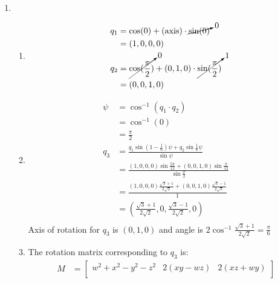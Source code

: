 \documentclass[11pt, oneside]{article}
\begin{document}
\begin{enumerate}[Problem 1:]
\begin{enumerate}[1.]
\begin{enumerate}[a)]
            {
              \begin{center}
                \myTikz
                {
                }
              \end{center}
            }
        \end{enumerate}
    \end{enumerate}
  \item
    \begin{enumerate}[1.]
      \item 
        \begin{align*}
          q_1 &= \cos(0) + (\mathrm{axis})\cdot\cancelto{0}{\sin(0)}\\
              &= (1,0,0,0)\\
          q_2 &= \cancelto{0}{\cos(\frac \pi 2)} + (0,1,0)\cdot\cancelto{1}{\sin(\frac \pi 2)}\\ 
              &= (0,0,1,0)
        \end{align*}
      \item
        \begin{align*}
          \psi &= \cos^{-1}(q_1\cdot q_2)\\
               &= \cos^{-1}(0)\\
               &= \frac \pi 2\\
          q_3 &= \frac {q_1\sin\left(1-\frac 1 6\right)\psi + q_2\sin \frac 1 6 \psi} {\sin \psi}\\
              &= \frac {(1,0,0,0)\sin \frac {5\pi} {12} + (0,0,1,0)\sin \frac \pi {12}} {\sin \frac \pi 2}\\
              &= \frac {(1,0,0,0)\frac {\sqrt 3 + 1} {2\sqrt 2} + (0,0,1,0)\frac {\sqrt 3 - 1} {2\sqrt 2}} 1\\
              &= \left(\frac {\sqrt 3 + 1} {2\sqrt 2}, 0, \frac {\sqrt 3 - 1} {2\sqrt 2},0\right)\\
        \end{align*}
        Axis of rotation for $q_3$ is $(0,1,0)$ and angle is $2\cos^{-1}\frac {\sqrt 3 + 1} {2\sqrt 2} = \frac \pi 6$
      \item
        The rotation matrix corresponding to $q_3$ is:
        \begin{align*}
          M &=
          \begin{bmatrix}
            w^2+x^2-y^2-z^2 & 2(xy-wz) & 2(xz+wy)\\

\end{bmatrix}
\end{align*}
\end{enumerate}
\end{enumerate}
\end{document}
